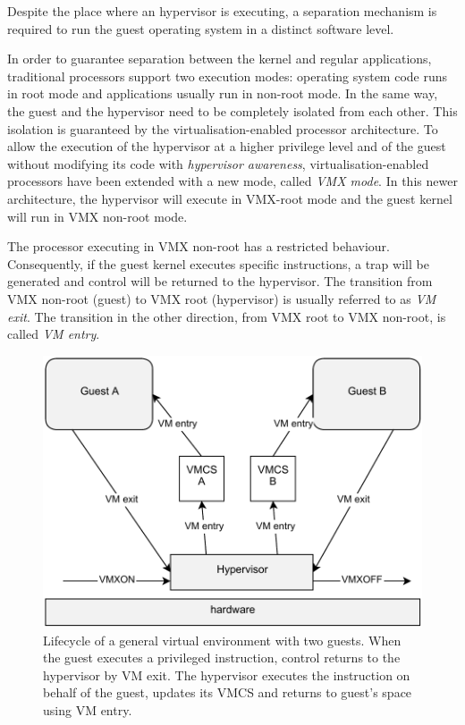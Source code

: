 Despite the place where an hypervisor is executing, a separation mechanism is required to run the guest operating system in a distinct software level.

In order to guarantee separation between the kernel and regular applications, traditional processors support two execution modes: operating system code runs in root mode and applications usually run in non-root mode. In the same way, the guest and the hypervisor need to be completely isolated from each other. This isolation is guaranteed by the virtualisation-enabled processor architecture.
To allow the execution of the hypervisor at a higher privilege level and of the guest without modifying its code with \emph{hypervisor awareness}, virtualisation-enabled processors have been extended with a new mode, called \emph{VMX mode}. %
In this newer architecture, the hypervisor will execute in VMX-root mode and the guest kernel will run in VMX non-root mode. 

The processor executing in VMX non-root has a restricted behaviour. Consequently, if the guest kernel executes specific instructions, a trap will be generated and control will be returned to the hypervisor. The transition from VMX non-root (guest) to VMX root (hypervisor) is usually referred to as \emph{VM exit}. The transition in the other direction, from VMX root to VMX non-root, is called \emph{VM entry}. 


\begin{figure}[htbp] 
\begin{center}
\includegraphics[scale=0.6]{images/virt_lifecycle.pdf}
\caption{{Lifecycle of a general virtual environment with two guests. When the guest executes a privileged instruction, control returns to the hypervisor by VM exit. The hypervisor executes the instruction on behalf of the guest, updates its VMCS and returns to guest's space using VM entry.}}
\label{virt_lifecycle}
\end{center}
\end{figure}

